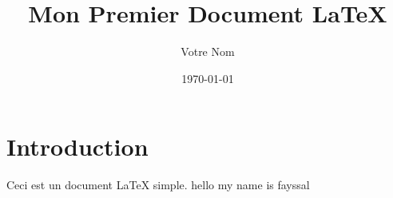 \documentclass{article}
\title{Mon Premier Document LaTeX}
\author{Votre Nom}
\date{\today}
\begin{document}
\maketitle
\section{Introduction}
Ceci est un document LaTeX simple.
hello
my name is fayssal 
\end{document}
